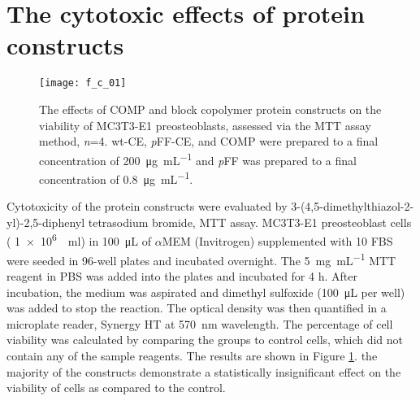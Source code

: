 \section{The cytotoxic effects of protein constructs}
\begin{figure}[h!] \centering \texttt{[image: f\_c\_01]}
    \caption{The effects of COMP and block copolymer protein constructs on the
        viability of MC3T3-E1 preosteoblasts, assessed via the MTT assay method,
        \emph{n}=4. wt-CE, \emph{p}FF-CE, and COMP were prepared to a final
        concentration of \SI{200}{\ug\per\mL} and \emph{p}FF was prepared to a
        final concentration of \SI{0.8}{\ug\per\mL}.}\label{fig:mtt_results}
    \end{figure}
Cytotoxicity of the protein constructs were evaluated by
3-(4,5-dimethylthiazol-2-yl)-2,5-diphenyl tetrasodium bromide, MTT assay.
MC3T3-E1 preosteoblast cells (
\SI[scientific-notation=true,retain-unity-mantissa=true]{1e6}{\per\ml}) in
\SI{100}{\uL} of ${\alpha}$MEM (Invitrogen) supplemented with \SI{10}{\volper}
FBS were seeded in 96-well plates and incubated overnight. The
\SI{5}{\mg\per\mL} MTT reagent in PBS was added into the plates and incubated
for 4 h. After incubation, the medium was aspirated and dimethyl sulfoxide
(\SI{100}{\uL} per well) was added to stop the reaction. The optical density was
then quantified in a microplate reader, Synergy HT at \SI{570}{\nm} wavelength.
The percentage of cell viability was calculated by comparing the groups to
control cells, which did not contain any of the sample reagents. The results are
shown in Figure \ref{fig:mtt_results}. the majority of the constructs
demonstrate a statistically insignificant effect on the viability of cells as
compared to the control.


